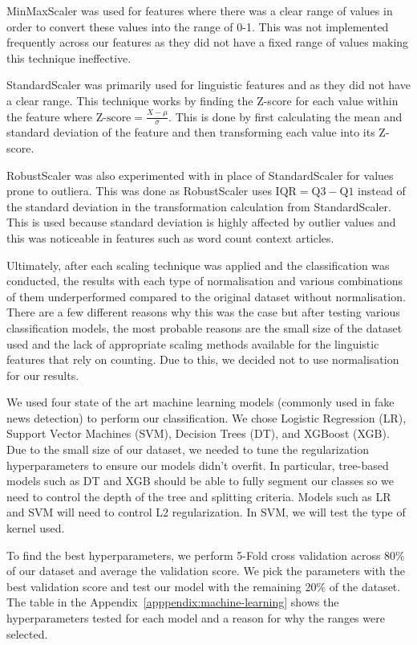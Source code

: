 \documentclass{article}
\begin{document}
MinMaxScaler was used for features where there was a clear range of values in order to convert these values into the range of 0-1. This was not implemented frequently across our features as they did not have a fixed range of values making this technique ineffective.

StandardScaler was primarily used for linguistic features and as they did not have a clear range. This technique works by finding the Z-score for each value within the feature where $\text{Z-score} = \frac{X - \mu}{\sigma}$. This is done by first calculating the mean and standard deviation of the feature and then transforming each value into its Z-score.

RobustScaler was also experimented with in place of StandardScaler for values prone to outliera. This was done as RobustScaler uses $\text{IQR} = \text{Q3} - \text{Q1}$ instead of the standard deviation in the transformation calculation from StandardScaler. This is used because standard deviation is highly affected by outlier values and this was noticeable in features such as word count context articles.

Ultimately, after each scaling technique was applied and the classification was conducted, the results with each type of normalisation and various combinations of them underperformed compared to the original dataset without normalisation. There are a few different reasons why this was the case but after testing various classification models, the most probable reasons are the small size of the dataset used and the lack of appropriate scaling methods available for the linguistic features that rely on counting. Due to this, we decided not to use normalisation for our results.



We used four state of the art machine learning models (commonly used in fake news detection) to perform our classification. We chose Logistic Regression (LR), Support Vector Machines (SVM), Decision Trees (DT), and XGBoost (XGB). Due to the small size of our dataset, we needed to tune the regularization hyperparameters to ensure our models didn't overfit. In particular, tree-based models such as DT and XGB should be able to fully segment our classes so we need to control the depth of the tree and splitting criteria. Models such as LR and SVM will need to control L2 regularization. In SVM, we will test the type of kernel used.

To find the best hyperparameters, we perform 5-Fold cross validation across 80\% of our dataset and average the validation score. We pick the parameters with the best validation score and test our model with the remaining 20\% of the dataset. The table in the Appendix~\ref{apppendix:machine-learning} shows the hyperparameters tested for each model and a reason for why the ranges were selected.
\end{document}
